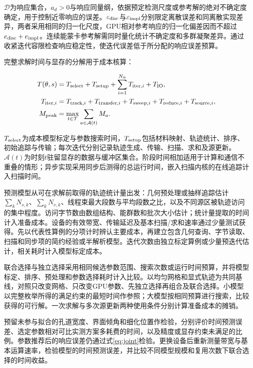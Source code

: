 \documentclass[UTF8, zihao=-4, fontset=none, a4paper]{ctexart}
\begin{document}
\(\mathcal D\)为响应集合，\(a_d>0\)与响应同量纲，依据预定检测尺度或参考解的绝对不确定度确定，用于控制近零响应的误差。\(\varepsilon_{\rm disc}\)与\(\varepsilon_{\rm impl}\)分别限定离散误差和同离散实现差异，两者采用相同的归一化尺度，GPU相对参考响应的归一化偏差因而不超过\(e_{\rm disc}+e_{\rm impl}\)。连续能蒙卡参考解需同时量化统计不确定度和多群凝聚差异。通过收紧迭代容限检查响应稳定性，使迭代误差低于所分配的响应误差预算。

完整求解时间与显存的分解用于成本核算：

\begin{equation}
\begin{aligned}
T(\theta,s)&=T_{\rm select}+T_{\rm setup}+\sum_{i=1}^{N_{\rm it}}T_{{\rm iter},i}+T_{\rm IO},\\
T_{{\rm iter},i}&=T_{{\rm track},i}+T_{{\rm transfer},i}+T_{{\rm sweep},i}
 +T_{{\rm reduce},i}+T_{{\rm source},i},\\
M_{\rm peak}&=\max_{t\in\mathcal T}\sum_{a\in\mathcal A(t)}M_a.
\end{aligned}
\label{eq:cost}
\end{equation}

\(T_{\rm select}\)为成本模型标定与参数搜索时间，\(T_{\rm setup}\)包括材料映射、轨迹统计、排序、初始追踪与传输；每次迭代分别记录轨迹生成、传输、扫描、求和及源更新。\(\mathcal A(t)\)为时刻\(t\)驻留显存的数据与缓冲区集合。阶段时间相加适用于计算和通信不重叠的情形；异步实现采用同步后测得的总运行时间，嵌入扫描内核的在线追踪计入扫描时间。

预测模型从可在求解前取得的轨迹统计量出发：几何预处理或抽样追踪估计\(\sum_kN_{s,k}\)、\(\sum_kN_{v,k}\)、线程束最大段数与平均段数之比，以及不同源区被轨迹访问的集中程度。访问字节数由数组结构、能群数和批次大小估计；统计量提取的时间计入准备成本。设备的有效带宽、传输延迟及基本扫描/求和速率通过少量测试获得。先以代表性算例的分项计时辨认主要成本，再建立包含几何查询、字节读取、扫描和同步项的简约经验或半解析模型。迭代次数由独立标定算例或少量预迭代估计，相关耗时计入模型标定成本。

联合选择与独立选择采用相同候选参数范围、搜索次数或运行时间预算，并将模型标定、排序、预处理和参数选择耗时计入比较。以均匀网格和显式轨迹为共同基线，对照只改变网格、只改变GPU参数、先独立选择再组合及联合选择。小模型以完整枚举所得的满足约束的最短时间作参照；大模型按相同预算进行搜索，比较获得的可行解。一次求解与多次源更新两种使用条件分别计算准备成本的摊销。

预留未参与拟合的孔道宽度、界面倾角和细化位置作检验，分别评价时间预测误差、选定参数相对可比实测方案多耗费的时间，以及精度或显存约束未满足的比例。参数推荐后的响应误差仍通过式\eqref{eq:joint}检验。更换设备后重新测量带宽与基本运算速率，检验模型的时间预测误差，并比较不同模型规模和复用次数下联合选择的时间收益。
\end{document}
